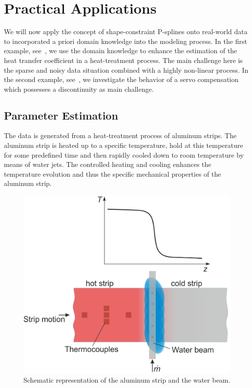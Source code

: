 \chapter{Practical Applications} \label{cha:practical-appl}

We will now apply the concept of shape-constraint P-splines onto real-world data to incorporated a priori domain knowledge into the modeling process. In the first example, see~, we use the domain knowledge to enhance the estimation of the heat transfer coefficient in a heat-treatment process. The main challenge here is the sparse and noisy data situation combined with a highly non-linear process. In the second example, see~, we investigate the behavior of a servo compensation which possesses a discontinuity as main challenge.  

\section{Parameter Estimation} \label{sec:real-world-application}

The data is generated from a heat-treatment process of aluminum strips. The aluminum strip is heated up to a specific temperature, hold at this temperature for some predefined time and then rapidly cooled down to room temperature by means of water jets. The controlled heating and cooling enhances the temperature evolution  and thus the specific mechanical properties of the aluminum strip. 

\begin{figure}[H]
	\centering
	\includegraphics[width=0.8\columnwidth]{graphics/pgfplots/cha5/Ebner/Water_Beam.png}
	\caption{Schematic representation of the aluminum strip and the water beam.}
	\label{fig:ebner_water_beam}
\end{figure}

